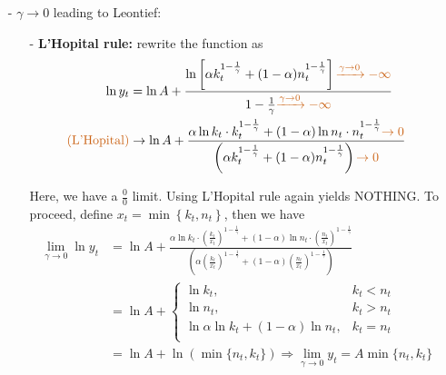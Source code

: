 \documentclass[10pt,landscape,a4paper]{article}
\begin{document}
\begin{multicols*}{3}
\begin{itemize}
    \item[-] $\gamma\rightarrow 0$ leading to Leontief:
    \begin{itemize}
        \item[-] \textbf{L'Hopital rule:} rewrite the function as 
        \begin{align*}
        \ln y_t &= \ln A +\frac{\ln\left[\alpha k_t^{1-\frac{1}{\gamma}}+(1-\alpha)n_t^{1-\frac{1}{\gamma}}\right]{\color{myorange}\xrightarrow{\gamma\rightarrow 0}-\infty}}{1-\frac{1}{\gamma}{\color{myorange}\xrightarrow{\gamma\rightarrow 0}-\infty}}\\
        {\color{myorange}(\text{L'Hopital})}&\rightarrow\ln A+\frac{\alpha \ln k_t\cdot k_t^{1-\frac{1}{\gamma}}+(1-\alpha) \ln n_t\cdot n_t^{1-\frac{1}{\gamma}}{\color{myorange}\rightarrow 0}}{\left(\alpha k_t^{1-\frac{1}{\gamma}}+(1-\alpha)n_t^{1-\frac{1}{\gamma}}\right){\color{myorange}\rightarrow 0}}
        \end{align*}
        
        Here, we have a $\frac{0}{0}$ limit. Using L'Hopital rule again yields NOTHING. To proceed, define $x_t=\min\left\{k_t,n_t\right\}$, then we have
        \begin{align*}
        \lim_{\gamma\rightarrow 0}\ln y_t &=\ln A+\frac{\alpha \ln k_t\cdot \left(\frac{k_t}{x_t}\right)^{1-\frac{1}{\gamma}}+(1-\alpha) \ln n_t\cdot \left(\frac{n_t}{x_t}\right)^{1-\frac{1}{\gamma}}}{\left(\alpha \left(\frac{k_t}{x_t}\right)^{1-\frac{1}{\gamma}}+(1-\alpha)\left(\frac{n_t}{x_t}\right)^{1-\frac{1}{\gamma}}\right)}\\
        &=\ln A +
        \begin{cases}
        \ln k_t, & k_t<n_t\\
        \ln n_t, & k_t>n_t\\
        \ln \alpha\ln k_t +(1-\alpha)\ln n_t, & k_t=n_t\\
        \end{cases}\\
        &=\ln A + \ln(\min\{n_t,k_t\})\Rightarrow \lim_{\gamma\rightarrow 0}y_t = A\min\{n_t,k_t\}
        \end{align*}
        

\end{itemize}
\end{itemize}
\end{multicols*}
\end{document}
